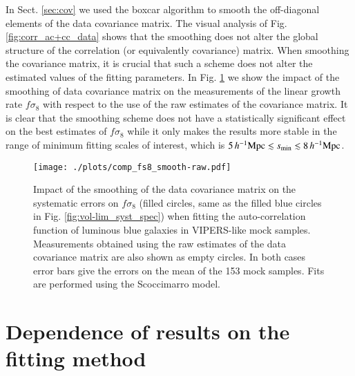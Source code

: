 \documentclass[longauth]{aa}
\def\mhmpc{\,h^{-1}{\rm Mpc}}
\begin{document}
In Sect. \ref{sec:cov} we used the boxcar algorithm \citep{mandelbaum13} to smooth the off-diagonal elements of the data covariance matrix. The visual analysis of Fig. \ref{fig:corr_ac+cc_data} shows that the smoothing does not alter the global structure of the correlation (or equivalently covariance) matrix. When smoothing the covariance matrix, it is crucial that such a scheme does not alter the estimated values of the fitting parameters. In Fig. \ref{fig:smooth-raw_fs8} we show the impact of the smoothing of data covariance matrix on the measurements of the linear growth rate $f\sigma_8$ with respect to the use of the raw estimates of the covariance matrix. It is clear that the smoothing scheme does not have a statistically significant effect on the best estimates of $f\sigma_8$ while it only makes the results more stable in the range of minimum fitting scales of interest, which is $5\mhmpc\lesssim s_{\rm{min}}\lesssim8\mhmpc$.
\begin{figure}
	\centering
		\texttt{[image: ./plots/comp\_fs8\_smooth-raw.pdf]}
		\caption{Impact of the smoothing of the data covariance matrix on the systematic errors on $f\sigma_8$ (filled circles, same as the filled blue circles in Fig. \ref{fig:vol-lim_syst_spec}) when fitting the auto-correlation function of luminous blue galaxies in VIPERS-like mock samples. Measurements obtained using the raw estimates of the data covariance matrix are also shown as empty circles. In both cases error bars give the errors on the mean of the 153 mock samples. Fits are performed using the Scoccimarro model.}\label{fig:smooth-raw_fs8}
	\end{figure}
    
    
    
    
\section{Dependence of results on the fitting method}\label{app:fit}
\end{document}

